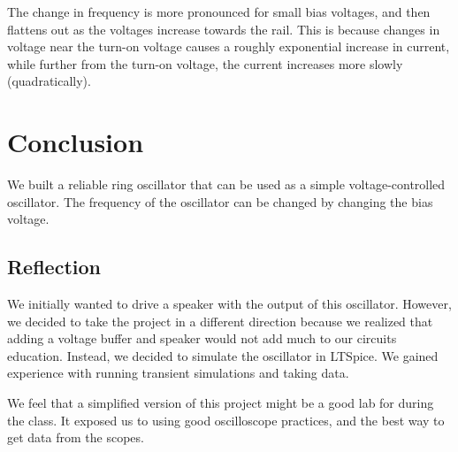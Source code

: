 \documentclass{article}
\begin{document}
The change in frequency is more pronounced for small bias voltages, and then flattens out as the voltages increase towards the rail.  This is because changes in voltage near the turn-on voltage causes a roughly exponential increase in current, while further from the turn-on voltage, the current increases more slowly (quadratically).  

\section{Conclusion}

We built a reliable ring oscillator that can be used as a simple voltage-controlled oscillator. The frequency of the oscillator can be changed by changing the bias voltage.

\subsection{Reflection}
We initially wanted to drive a speaker with the output of this oscillator. However, we decided to take the project in a different direction because we realized that adding a voltage buffer and speaker would not add much to our circuits education. Instead, we decided to simulate the oscillator in LTSpice. We gained experience with running transient simulations and taking data.

We feel that a simplified version of this project might be a good lab for during the class. It exposed us to using good oscilloscope practices, and the best way to get data from the scopes. 
\end{document}
